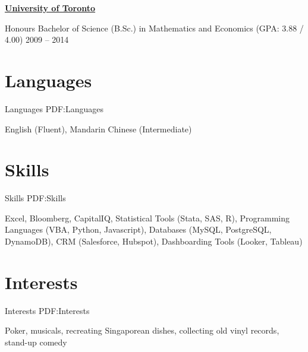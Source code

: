 \documentclass[letterpaper,10pt,oneside]{article}
\begin{document}
\begin{body}
\href{https://www.utoronto.ca/}
{\textbf{University of Toronto}}

\GapNoBreak
\BulletItem
Honours Bachelor of Science (B.Sc.) in Mathematics and Economics (GPA: 3.88 / 4.00)
\hfill
2009 -- 2014


\section
{Languages}
{Languages}
{PDF:Languages}

English (Fluent), Mandarin Chinese (Intermediate)


\section
{Skills}
{Skills}
{PDF:Skills}

Excel, Bloomberg, CapitalIQ, Statistical Tools (Stata, SAS, R), Programming Languages (VBA, Python, Javascript), Databases (MySQL, PostgreSQL, DynamoDB), CRM (Salesforce, Hubspot), Dashboarding Tools (Looker, Tableau)


\section
{Interests}
{Interests}
{PDF:Interests}

Poker, musicals, recreating Singaporean dishes, collecting old vinyl records, stand-up comedy

\end{body}
\end{document}
